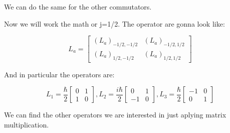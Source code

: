 We can do the same for the other commutators.

Now we will work the math or j=1/2. The operator are gonna look like:

\begin{equation}
  L_a =
    \left[\begin{matrix}
      (L_a)_{-1/2,-1/2} & (L_a)_{-1/2,1/2}\\
      (L_a)_{1/2,-1/2} & (L_a)_{1/2,1/2}
    \end{matrix}\right]
\end{equation}

And in particular the operators are:

\begin{equation}
  L_1 = \frac{\hbar}{2}
    \left[\begin{matrix}
      0 & 1\\
      1 & 0
    \end{matrix}\right],
  L_2 = \frac{i\hbar}{2}
    \left[\begin{matrix}
      0 & 1\\
      -1 & 0
    \end{matrix}\right],
  L_3 = \frac{\hbar}{2}
    \left[\begin{matrix}
      -1 & 0\\
      0 & 1
    \end{matrix}\right]
\end{equation}

We can find the other operators we are interested in just aplying matrix multiplication.


